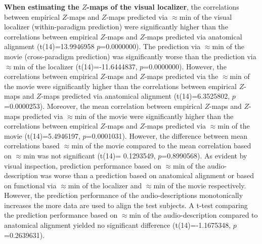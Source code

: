 %
\textbf{When estimating the $Z$-maps of the visual localizer}, the correlations
between empirical $Z$-maps and $Z$-maps predicted via $\approx$\unit[15]{min} of
the visual localizer (within-paradigm prediction) were significantly higher than
the correlations between empirical $Z$-maps and $Z$-maps predicted via
anatomical alignment (t(14)=13.9946958 $p$=0.0000000).
%
The prediction via $\approx$\unit[15]{min} of the movie (cross-paradigm
prediction) was significantly worse than the prediction via
$\approx$\unit[15]{min} of the localizer (t(14)=-11.6444837, $p$=0.0000000).
%
However, the correlations between empirical $Z$-maps and $Z$-maps predicted via
the $\approx$\unit[15]{min} of the movie were significantly higher than the
correlations between empirical $Z$-maps and $Z$-maps predicted via anatomical
alignment (t(14)=6.3525802, $p$=0.0000253).
%
Moreover, the mean correlation between empirical $Z$-maps and $Z$-maps predicted
via $\approx$\unit[30]{min} of the movie were significantly higher than the
correlations between empirical $Z$-maps and $Z$-maps predicted via
$\approx$\unit[15]{min} of the movie (t(14)=5.4946197, $p$=0.0001031).
%
However, the difference between mean correlations based $\approx$\unit[45]{min}
of the movie compared to the mean correlation based on $\approx$\unit[30]{min}
was not significant (t(14)= 0.1293549, $p$=0.8990568).
%
As evident by visual inspection, prediction performance based on
$\approx$\unit[15]{min} of the audio-description was worse than a prediction
based on anatomical alignment or based on functional via $\approx$\unit[15]{min}
of the localizer and $\approx$\unit[15]{min} of the movie respectively.
%
However, the prediction performance of the audio-descriptions monotonically
increases the more data are used to align the test subjects.
%
A t-test comparing the prediction performance based on $\approx$\unit[120]{min}
of the audio-description compared to anatomical alignment yielded no significant
difference (t(14)=-1.1675348, $p$=0.2639631).


